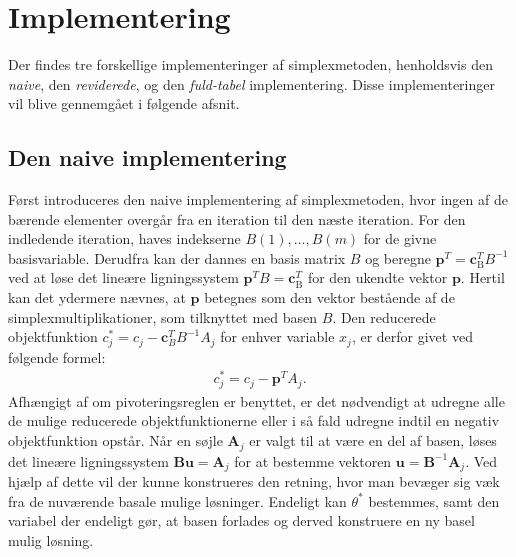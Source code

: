 %
\section{Implementering}
\label{julieergudesmuk}
Der findes tre forskellige implementeringer af simplexmetoden, henholdsvis den \textit{naive}, den \textit{reviderede}, og den \textit{fuld-tabel} implementering. Disse implementeringer vil blive gennemgået i følgende afsnit. 

\subsection{Den naive implementering}
Først introduceres den naive implementering af simplexmetoden, hvor ingen af de bærende elementer overgår fra en iteration til den næste iteration. 
For den indledende iteration, haves indekserne
$B(1),\ldots,B(m)$ for de givne basisvariable. 
Derudfra kan der dannes en basis matrix $B$ og beregne $\mathbf{p}^T=\mathbf{c}_{\text{B}}^T B^{-1}$ ved at løse det lineære ligningssystem $\mathbf{p}^T B=\mathbf{c}_{\text{B}}^T$ for den ukendte vektor $\mathbf{p}$. 
Hertil kan det ydermere nævnes, at $\mathbf{p}$ betegnes som den vektor bestående af de simplexmultiplikationer, som tilknyttet med basen $B$. 
Den reducerede objektfunktion $c_j^* = c_j - \mathbf{c}_B^T B^{-1}A_j$ for enhver variable $x_j$, er derfor givet ved følgende formel:
%
\begin{align*}
c_j^* = c_j - \mathbf{p}^T A_j.
\end{align*}
%
Afhængigt af om pivoteringsreglen er benyttet, er det nødvendigt at udregne alle de mulige reducerede objektfunktionerne eller i så fald udregne indtil en negativ objektfunktion opstår. Når en søjle $\mathbf{A}_j$ er valgt til at være en del af basen, løses det lineære ligningssystem $\mathbf{Bu}=\mathbf{A}_j$ for at bestemme vektoren $\mathbf{u}=\mathbf{B}^{-1}\mathbf{A}_j$. Ved hjælp af dette vil der kunne konstrueres den retning, hvor man bevæger sig væk fra de nuværende basale mulige løsninger. Endeligt kan $\theta^*$ bestemmes, samt den variabel der endeligt gør, at basen forlades og derved konstruere en ny basel mulig løsning. \\\\
%
